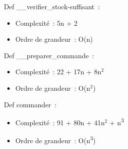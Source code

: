 \documentclass[]{article}
\begin{document}
Def \_\_verifier\_stock-suffisant~:

\begin{itemize}
\item
  Complexité~: 5n + 2
\item
  Ordre de grandeur~: O(n)
\end{itemize}

Def \_\_preparer\_commande~:

\begin{itemize}
\item
  Complexité~: 22 + 17n + 8n\(^{2}\)
\item
  Ordre de grandeur~: O(n\(^{2}\))
\end{itemize}

Def commander~:

\begin{itemize}
\item
  Complexité~: 91 + 80n + 41n\(^{2}\) + n\textsuperscript{3}
\item
  Ordre de grandeur~: O(n\textsuperscript{3})
\end{itemize}
\end{document}

